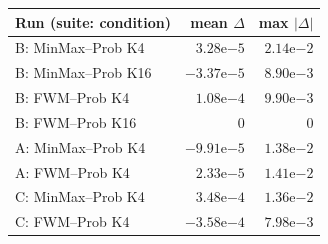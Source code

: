 \begin{tabular}{lrr}
\toprule
Run (suite: condition) & mean $\Delta$ & max $|\Delta|$ \\
\midrule
B: MinMax--Prob K4 & $3.28\mathrm{e}{-5}$ & $2.14\mathrm{e}{-2}$ \\
B: MinMax--Prob K16 & $-3.37\mathrm{e}{-5}$ & $8.90\mathrm{e}{-3}$ \\
B: FWM--Prob K4 & $1.08\mathrm{e}{-4}$ & $9.90\mathrm{e}{-3}$ \\
B: FWM--Prob K16 & $0$ & $0$ \\
A: MinMax--Prob K4 & $-9.91\mathrm{e}{-5}$ & $1.38\mathrm{e}{-2}$ \\
A: FWM--Prob K4 & $2.33\mathrm{e}{-5}$ & $1.41\mathrm{e}{-2}$ \\
C: MinMax--Prob K4 & $3.48\mathrm{e}{-4}$ & $1.36\mathrm{e}{-2}$ \\
C: FWM--Prob K4 & $-3.58\mathrm{e}{-4}$ & $7.98\mathrm{e}{-3}$ \\
\bottomrule
\end{tabular}
